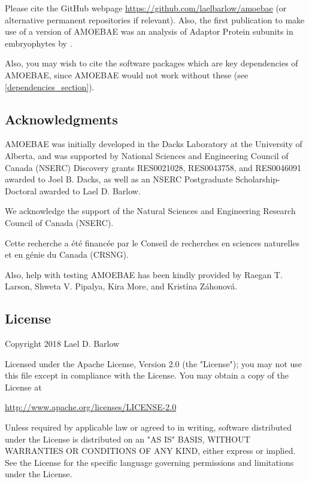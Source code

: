 \documentclass[12pt,letterpaper]{article}
\begin{document}
\begin{linenumbers}
Please cite the GitHub webpage \url{https://github.com/laelbarlow/amoebae} (or
alternative permanent repositories if relevant). Also, the first publication to
make use of a version of AMOEBAE was an analysis of Adaptor Protein subunits in
embryophytes by \cite{larson2019}.

Also, you may wish to cite the software packages which are key dependencies of
AMOEBAE, since AMOEBAE would not work without these (see
\autoref*{dependencies_section}).

\subsection{Acknowledgments}

AMOEBAE was initially developed in the Dacks Laboratory at the University of
Alberta, and was supported by National Sciences and Engineering Council of
Canada (NSERC) Discovery grants RES0021028, RES0043758, and RES0046091 awarded
to Joel B. Dacks, as well as an NSERC Postgraduate Scholarship-Doctoral awarded
to Lael D. Barlow.

We acknowledge the support of the Natural Sciences and Engineering Research Council of Canada (NSERC).

Cette recherche a \'et\'e financ\'ee par le Conseil de recherches en sciences naturelles et en g\'enie du Canada (CRSNG).

Also, help with testing AMOEBAE has been kindly provided by Raegan T. Larson,
Shweta V. Pipalya, Kira More, and Krist\'ina Z\'ahonov\'a.

\subsection{License}
\label{license_section}

Copyright 2018 Lael D. Barlow

Licensed under the Apache License, Version 2.0 (the "License"); you may not use this file except in compliance with the License. You may obtain a copy of the License at

\url{http://www.apache.org/licenses/LICENSE-2.0}

Unless required by applicable law or agreed to in writing, software distributed under the License is distributed on an "AS IS" BASIS, WITHOUT WARRANTIES OR CONDITIONS OF ANY KIND, either express or implied. See the License for the specific language governing permissions and limitations under the License.



\end{linenumbers}
\end{document}
